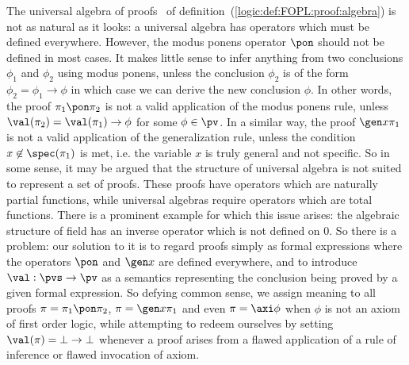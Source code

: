 The universal algebra of proofs \pvs\ of
definition~(\ref{logic:def:FOPL:proof:algebra}) is not as natural as
it looks: a universal algebra has operators which must be defined
everywhere. However, the modus ponens operator $\pon$ should not be
defined in most cases. It makes little sense to infer anything from
two conclusions $\phi_{1}$ and $\phi_{2}$ using modus ponens, unless
the conclusion $\phi_{2}$ is of the form $\phi_{2}=\phi_{1}\to\phi$
in which case we can derive the new conclusion $\phi$. In other
words, the proof $\pi_{1}\pon\pi_{2}$ is not a valid application of
the modus ponens rule, unless $\val(\pi_{2})=\val(\pi_{1})\to\phi$
for some $\phi\in\pv$. In a similar way, the proof $\gen x\pi_{1}$
is not a valid application of the generalization rule, unless the
condition $x\not\in\spec(\pi_{1})$ is met, i.e. the variable $x$ is
truly general and not specific. So in some sense, it may be argued
that the structure of universal algebra is not suited to represent a
set of proofs. These proofs have operators which are naturally
partial functions, while universal algebras require operators which
are total functions. There is a prominent example for which this
issue arises: the algebraic structure of field has an inverse
operator which is not defined on $0$. So there is a problem: our
solution to it is to regard proofs simply as formal expressions
where the operators $\pon$ and $\gen x$ are defined everywhere, and
to introduce $\val:\pvs\to\pv$ as a semantics representing the
conclusion being proved by a given formal expression. So defying
common sense, we assign meaning to all proofs
$\pi=\pi_{1}\pon\pi_{2}$, $\pi=\gen x\pi_{1}$ and even
$\pi=\axi\phi$ when $\phi$ is not an axiom of first order logic,
while attempting to redeem ourselves by setting
$\val(\pi)=\bot\to\bot$ whenever a proof arises from a flawed
application of a rule of inference or flawed invocation of axiom.

